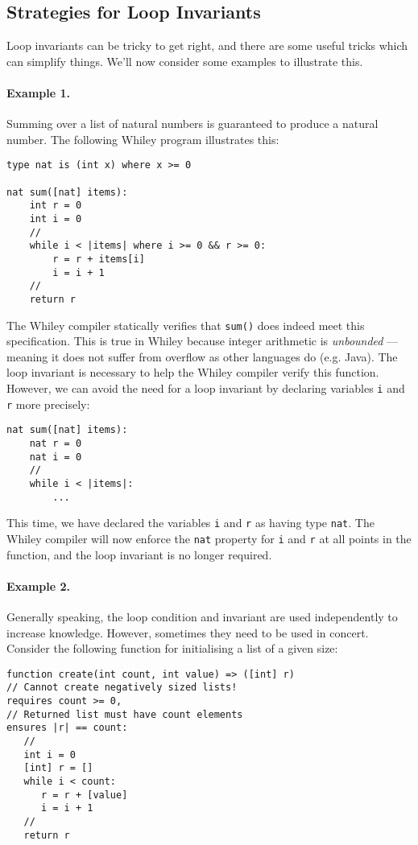 \subsection{Strategies for Loop Invariants}
Loop invariants can be tricky to get right, and there are some useful
tricks which can simplify things.  We'll now consider some examples to
illustrate this.

\paragraph{Example 1.} Summing over a list of natural numbers is
guaranteed to produce a natural number.  The following Whiley program
illustrates this:

\begin{lstlisting}
type nat is (int x) where x >= 0

nat sum([nat] items):
    int r = 0
    int i = 0
    //
    while i < |items| where i >= 0 && r >= 0:
        r = r + items[i]
        i = i + 1
    //
    return r
\end{lstlisting}
The Whiley compiler statically verifies that \lstinline{sum()} does
indeed meet this specification.  This is true in Whiley because
integer arithmetic is {\em unbounded} --- meaning it does not suffer
from overflow as other languages do (e.g. Java).  The loop invariant
is necessary to help the Whiley compiler verify this function.
However, we can avoid the need for a loop invariant by declaring
variables \lstinline{i} and \lstinline{r} more precisely:
\begin{lstlisting}
nat sum([nat] items):
    nat r = 0
    nat i = 0
    //
    while i < |items|:
        ...
\end{lstlisting}

This time, we have declared the variables \lstinline{i} and
\lstinline{r} as having type \lstinline{nat}.  The Whiley compiler
will now enforce the \lstinline{nat} property for \lstinline{i} and
\lstinline{r} at all points in the function, and the loop invariant is
no longer required.

\paragraph{Example 2.}  Generally speaking, the loop condition and
invariant are used independently to increase knowledge.  However,
sometimes they need to be used in concert.  Consider the following
function for initialising a list of a given size:

\begin{lstlisting}
function create(int count, int value) => ([int] r)
// Cannot create negatively sized lists!
requires count >= 0, 
// Returned list must have count elements
ensures |r| == count:
   //
   int i = 0
   [int] r = []
   while i < count:
      r = r + [value]
      i = i + 1
   //
   return r
\end{lstlisting}

